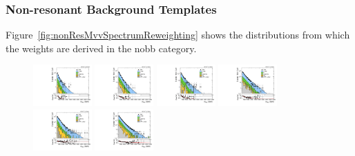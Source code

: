 \subsubsection{Non-resonant Background Templates}

Figure~\ref{fig:nonResMvvSpectrumReweighting} shows the \MVV distributions from which the weights are derived in the nobb category.

\begin{figure}[htbp]
  \centering
  \includegraphics[width=0.2\textwidth]{fig/analysisAppendix/slopesSB_b1_allL_HP_bb_LDy_Run2_mWV_1OverX.pdf}
  \includegraphics[width=0.2\textwidth]{fig/analysisAppendix/slopesSB_b1_allL_LP_bb_LDy_Run2_mWV_1OverX.pdf}
  \includegraphics[width=0.2\textwidth]{fig/analysisAppendix/slopesSB_b1_allL_HP_bb_HDy_Run2_mWV_1OverX.pdf}
  \includegraphics[width=0.2\textwidth]{fig/analysisAppendix/slopesSB_b1_allL_LP_bb_HDy_Run2_mWV_1OverX.pdf}\\
  \includegraphics[width=0.2\textwidth]{fig/analysisAppendix/slopesSB_b1_allL_HP_nobb_LDy_Run2_mWV_1OverX.pdf}
  \includegraphics[width=0.2\textwidth]{fig/analysisAppendix/slopesSB_b1_allL_LP_nobb_LDy_Run2_mWV_1OverX.pdf}

\end{figure}
